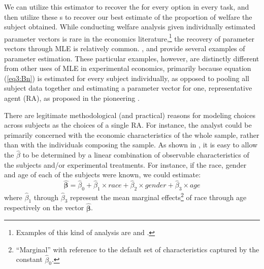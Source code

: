 \documentclass[../main.tex]{subfiles}
\begin{document}
We can utilize this estimator to recover the {\CE} for every option in every task, and then utilize these \CE s to recover our best estimate of the proportion of welfare the subject obtained.
While conducting welfare analysis given individually estimated parameter vectors is rare in the economics literature,\footnote{
	Examples of this kind of analysis are \textcite{Harrison2016, Harrison2017} and \textcite{Harrison2017a}.
} the recovery of parameter vectors through MLE is relatively common.
\textcite{Hey1994}, \textcite{Wilcox2015} and \textcite{Hey2001} provide several examples of parameter estimation.
These particular examples, however, are distinctly different from other uses of MLE in experimental economics, primarily because equation (\ref{eq3:Bn}) is estimated for every subject individually, as opposed to pooling all subject data together and estimating a parameter vector for one, representative agent (RA), as proposed in the pioneering \textcite{Camerer1994}.


There are legitimate methodological (and practical) reasons for modeling choices across subjects as the choices of a single RA.
For instance, the analyst could be primarily concerned with the economic characteristics of the whole sample, rather than with the individuals composing the sample.
As shown in \textcite[63]{Harrison2008}, it is easy to allow the $\hat{\beta}$ to be determined by a linear combination of observable characteristics of the subjects and/or experimental treatments.
For instance, if the race, gender and age of each of the subjects were known, we could estimate:
\begin{equation}
	\label{eq3:BB}
	\bm{\hat{\beta}} = \hat{\beta}_0 + \hat{\beta}_1 \times \mathit{race} + \hat{\beta}_2 \times \mathit{gender} + \hat{\beta}_3 \times \mathit{age}
\end{equation}
\noindent where $\hat{\beta}_1$ through $\hat{\beta}_3$ represent the mean marginal effects\footnote{
	\enquote{Marginal} with reference to the default set of characteristics captured by the constant $\hat{\beta}_0$.
} of race through age respectively on the vector $\bm{\hat{\beta}}$.

\end{document}
